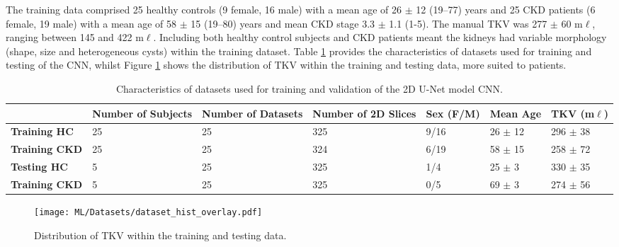 The training data comprised 25 healthy controls (9 female, 16 male) with a mean age of 26 $\pm$ 12 (19–77) years and 25 \ac{CKD} patients (6 female, 19 male) with a mean age of 58 $\pm$ 15 (19–80) years and mean \ac{CKD} stage 3.3 $\pm$ 1.1 (1-5). The manual \ac{TKV} was 277 $\pm$ 60 m$\ell$, ranging between 145 and 422 m$\ell$. Including both healthy control subjects and \ac{CKD} patients meant the kidneys had variable morphology (shape, size and heterogeneous cysts) within the training dataset. Table \ref{tab:ml_datasets} provides the characteristics of datasets used for training and testing of the \ac{CNN}, whilst Figure \ref{fig:ml_true_tkv_hist} shows the distribution of \ac{TKV} within the training and testing data, more suited to patients.
\begin{table}[H]
	\centering
	\begin{adjustbox}{width=1.0\textwidth, center}
	\begin{tabularx}{1.1\textwidth}{X|X|X|X|X|X|X}
		& \textbf{Number of Subjects} & \textbf{Number of Datasets} & \textbf{Number of 2D Slices} & \textbf{Sex (F/M)} & \textbf{Mean Age} & \textbf{TKV (m$\ell$)} \\ \hline
		\textbf{Training HC}  & 25                          & 25                          & 325                          & 9/16               & 26 $\pm$ 12       & 296 $\pm$ 38           \\
		\hline
		\textbf{Training CKD} & 25                          & 25                          & 324                          & 6/19               & 58 $\pm$ 15       & 258 $\pm$ 72           \\
		\hline
		\textbf{Testing HC}   & 5                           & 25                          & 325                          & 1/4                & 25 $\pm$ 3        & 330 $\pm$ 35           \\
		\hline
		\textbf{Training CKD} & 5                           & 25                          & 325                          & 0/5                & 69 $\pm$ 3        & 274 $\pm$ 56          
	\end{tabularx}
	\end{adjustbox}
	\caption{Characteristics of datasets used for training and validation of the 2D U-Net model \ac{CNN}.}
	\label{tab:ml_datasets}
\end{table}
\begin{figure}[H]
	\centering
	\texttt{[image: ML/Datasets/dataset\_hist\_overlay.pdf]}
	\caption{Distribution of \ac{TKV} within the training and testing data.}
	\label{fig:ml_true_tkv_hist}	
\end{figure}


